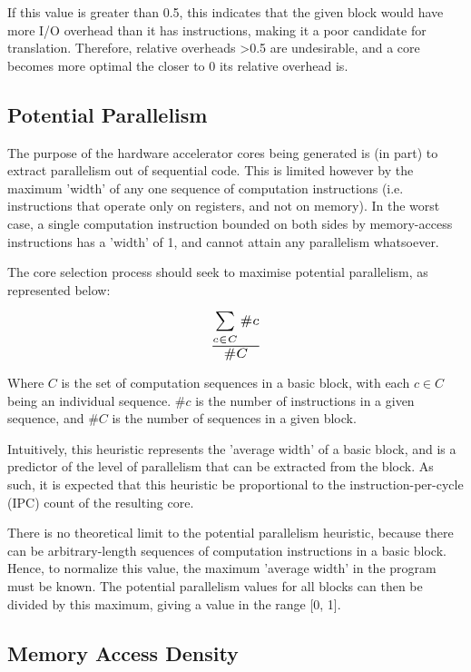 \documentclass{UoYCSproject}
\begin{document}
If this value is greater than 0.5, this indicates that the given block would have more I/O overhead than it has instructions,
making it a poor candidate for translation. Therefore, relative overheads >0.5 are undesirable, and a core becomes more optimal
the closer to 0 its relative overhead is.

\subsection{Potential Parallelism}

The purpose of the hardware accelerator cores being generated is (in part) to extract parallelism out of sequential code.
This is limited however by the maximum 'width' of any one sequence of computation instructions (i.e. instructions that operate
only on registers, and not on memory). In the worst case, a single computation instruction bounded on both sides by memory-access
instructions has a 'width' of 1, and cannot attain any parallelism whatsoever.

The core selection process should seek to maximise potential parallelism, as represented below:

\begin{equation}
\scalebox{1.5}{$\frac{\sum\limits_{c \in C} \#c}{\#C}$}
\end{equation}

Where \(C\) is the set of computation sequences in a basic block, with each \(c \in C\) being an individual sequence.
\(\#c\) is the number of instructions in a given sequence, and \(\#C\) is the number of sequences in a given block.

Intuitively, this heuristic represents the 'average width' of a basic block, and is a predictor of the level of parallelism that
can be extracted from the block. As such, it is expected that this heuristic be proportional to the instruction-per-cycle (IPC)
count of the resulting core.

There is no theoretical limit to the potential parallelism heuristic, because there can be arbitrary-length sequences of
computation instructions in a basic block. Hence, to normalize this value, the maximum 'average width' in the program must be
known. The potential parallelism values for all blocks can then be divided by this maximum, giving a value in the range [0, 1].

\subsection{Memory Access Density}
\end{document}
